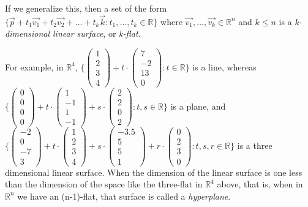 \documentclass[11pt]{amsart} %
\theoremstyle{plain}
\theoremstyle{definition}
\theoremstyle{definition}
\theoremstyle{remark}
\theoremstyle{definition}
\begin{document}
\medskip
If we generalize this, then a set of the form $\{ \vec{p} + t_1\vec{v_1} + t_2\vec{v_2} +\dots+ t_k\vec{k} : t_1,\dots,t_k \in\mathbb{R} \}$ where $\vec{v_1},\dots,\vec{v_k} \in\mathbb{R}^{n}$ and $k\leq n$ is a \emph{k-dimensional linear surface}, or \emph{k-flat}.

\smallskip
For example, in $\mathbb{R}^{4}$, $\{ \left( \begin{smallmatrix} 1 \\ 2 \\ 3 \\ 4 \end{smallmatrix} \right) + t \cdot \left( \begin{smallmatrix} 7 \\ -2 \\ 13 \\ 0 \end{smallmatrix} \right) : t \in\mathbb{R}\}$ is a line, whereas $\{ \left( \begin{smallmatrix} 0 \\ 0 \\ 0 \\ 0 \end{smallmatrix} \right) + t \cdot \left( \begin{smallmatrix} 1 \\ -1 \\ 1 \\ -1 \end{smallmatrix} \right) + s \cdot \left( \begin{smallmatrix} 2 \\ 2 \\ 0 \\ 2 \end{smallmatrix} \right) : t,s \in\mathbb{R} \}$ is a plane, and $\{ \left( \begin{smallmatrix} -2 \\ 0 \\ -7 \\ 3 \end{smallmatrix} \right) + t \cdot \left( \begin{smallmatrix} 1 \\ 2 \\ 3 \\ 4 \end{smallmatrix} \right) + s \cdot \left( \begin{smallmatrix} -3.5 \\ 5 \\ 5 \\ 1 \end{smallmatrix} \right) + r \cdot \left( \begin{smallmatrix} 0 \\ 2 \\ 3 \\ 0 \end{smallmatrix} \right) : t,s,r \in\mathbb{R} \}$ is a three dimensional linear surface.
\smallskip
When the dimension of the linear surface is one less than the dimension of the space like the three-flat in $\mathbb{R}^{4}$ above, that is, when in $\mathbb{R}^{n}$ we have an (n-1)-flat, that surface is called a \emph{hyperplane}.
\end{document}
